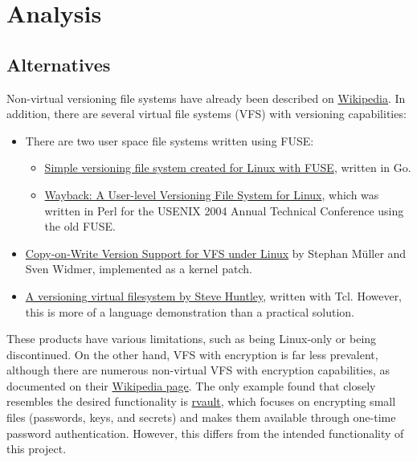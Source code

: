 \chapter{Analysis}

\section{Alternatives}

Non-virtual versioning file systems have already been described on \href{https://en.wikipedia.org/wiki/Versioning_file_system}{Wikipedia}.
In addition, there are several virtual file systems (VFS) with versioning capabilities:

\begin{itemize}
\item There are two user space file systems written using FUSE:
\begin{itemize}
\item \href{https://github.com/FooSoft/vfs}{Simple versioning file system created for Linux with FUSE}, written in Go.
\item \href{https://www.usenix.org/legacy/events/usenix04/tech/freenix/cornell.html}{Wayback: A User-level Versioning File System for Linux}, which was written in Perl for the USENIX 2004 Annual Technical Conference using the old FUSE.
\end{itemize}
\item \href{https://osm.hpi.de/vvfs/}{Copy-on-Write Version Support for VFS under Linux} by Stephan Müller and Sven Widmer, implemented as a kernel patch.
\item \href{https://wiki.tcl-lang.org/page/A+versioning+virtual+filesystem}{A versioning virtual filesystem by Steve Huntley}, written with Tcl. However, this is more of a language demonstration than a practical solution.
\end{itemize}

These products have various limitations, such as being Linux-only or being discontinued. On the other hand, VFS with encryption is far less prevalent, although there are numerous non-virtual VFS with encryption capabilities, as documented on their \href{https://en.wikipedia.org/wiki/Encrypting_File_System}{Wikipedia page}. The only example found that closely resembles the desired functionality is \href{https://github.com/rmind/rvault}{rvault}, which focuses on encrypting small files (passwords, keys, and secrets) and makes them available through one-time password authentication. However, this differs from the intended functionality of this project.

